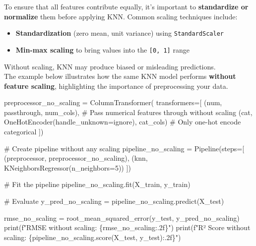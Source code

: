 \documentclass[
  letterpaper,
  DIV=11,
  numbers=noendperiod]{scrreprt}
\newenvironment{Shaded}{\begin{snugshade}}{\end{snugshade}}
\newcommand{\BuiltInTok}[1]{\textcolor[rgb]{0.00,0.23,0.31}{#1}}
\newcommand{\CommentTok}[1]{\textcolor[rgb]{0.37,0.37,0.37}{#1}}
\newcommand{\DecValTok}[1]{\textcolor[rgb]{0.68,0.00,0.00}{#1}}
\newcommand{\NormalTok}[1]{\textcolor[rgb]{0.00,0.23,0.31}{#1}}
\newcommand{\OperatorTok}[1]{\textcolor[rgb]{0.37,0.37,0.37}{#1}}
\newcommand{\SpecialCharTok}[1]{\textcolor[rgb]{0.37,0.37,0.37}{#1}}
\newcommand{\SpecialStringTok}[1]{\textcolor[rgb]{0.13,0.47,0.30}{#1}}
\newcommand{\StringTok}[1]{\textcolor[rgb]{0.13,0.47,0.30}{#1}}
\providecommand{\tightlist}{%
  \setlength{\itemsep}{0pt}\setlength{\parskip}{0pt}}\usepackage{longtable,booktabs,array}
\begin{document}
To ensure that all features contribute equally, it's important to
\textbf{standardize or normalize} them before applying KNN. Common
scaling techniques include:

\begin{itemize}
\tightlist
\item
  \textbf{Standardization} (zero mean, unit variance) using
  \texttt{StandardScaler}
\item
  \textbf{Min-max scaling} to bring values into the \texttt{{[}0,\ 1{]}}
  range
\end{itemize}

Without scaling, KNN may produce biased or misleading predictions.\\
The example below illustrates how the same KNN model performs
\textbf{without feature scaling}, highlighting the importance of
preprocessing your data.

\begin{Shaded}
\begin{Highlighting}[]
\NormalTok{preprocessor\_no\_scaling }\OperatorTok{=}\NormalTok{ ColumnTransformer(}
\NormalTok{    transformers}\OperatorTok{=}\NormalTok{[}
\NormalTok{        (}\StringTok{\textquotesingle{}num\textquotesingle{}}\NormalTok{, }\StringTok{\textquotesingle{}passthrough\textquotesingle{}}\NormalTok{, num\_cols),  }\CommentTok{\# Pass numerical features through without scaling}
\NormalTok{        (}\StringTok{\textquotesingle{}cat\textquotesingle{}}\NormalTok{, OneHotEncoder(handle\_unknown}\OperatorTok{=}\StringTok{\textquotesingle{}ignore\textquotesingle{}}\NormalTok{), cat\_cols)  }\CommentTok{\# Only one{-}hot encode categorical}
\NormalTok{    ])}

\CommentTok{\# Create pipeline without any scaling}
\NormalTok{pipeline\_no\_scaling }\OperatorTok{=}\NormalTok{ Pipeline(steps}\OperatorTok{=}\NormalTok{[}
\NormalTok{    (}\StringTok{\textquotesingle{}preprocessor\textquotesingle{}}\NormalTok{, preprocessor\_no\_scaling),}
\NormalTok{    (}\StringTok{\textquotesingle{}knn\textquotesingle{}}\NormalTok{, KNeighborsRegressor(n\_neighbors}\OperatorTok{=}\DecValTok{5}\NormalTok{))}
\NormalTok{])}

\CommentTok{\# Fit the pipeline}
\NormalTok{pipeline\_no\_scaling.fit(X\_train, y\_train)}

\CommentTok{\# Evaluate}
\NormalTok{y\_pred\_no\_scaling }\OperatorTok{=}\NormalTok{ pipeline\_no\_scaling.predict(X\_test)}

\NormalTok{rmse\_no\_scaling }\OperatorTok{=}\NormalTok{ root\_mean\_squared\_error(y\_test, y\_pred\_no\_scaling)}
\BuiltInTok{print}\NormalTok{(}\SpecialStringTok{f"RMSE without scaling: }\SpecialCharTok{\{}\NormalTok{rmse\_no\_scaling}\SpecialCharTok{:.2f\}}\SpecialStringTok{"}\NormalTok{)}
\BuiltInTok{print}\NormalTok{(}\SpecialStringTok{f"R² Score without scaling: }\SpecialCharTok{\{}\NormalTok{pipeline\_no\_scaling}\SpecialCharTok{.}\NormalTok{score(X\_test, y\_test)}\SpecialCharTok{:.2f\}}\SpecialStringTok{"}\NormalTok{)}
\end{Highlighting}
\end{Shaded}
\end{document}
